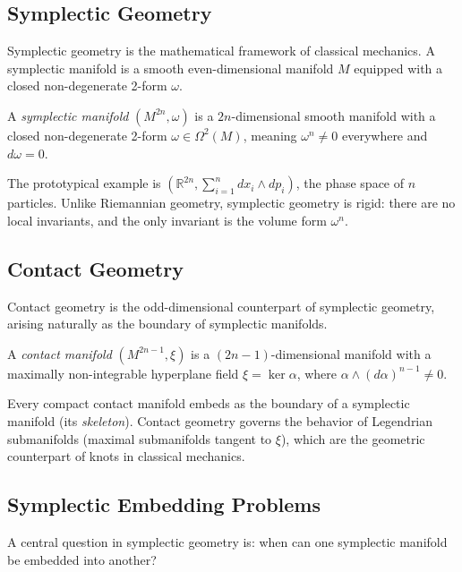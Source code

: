 \subsection{Symplectic Geometry}

Symplectic geometry is the mathematical framework of classical mechanics. A symplectic manifold is a smooth even-dimensional manifold $M$ equipped with a closed non-degenerate 2-form $\omega$.

\begin{definition}
A \emph{symplectic manifold} $(M^{2n}, \omega)$ is a $2n$-dimensional smooth manifold with a closed non-degenerate 2-form $\omega \in \Omega^2(M)$, meaning $\omega^n \neq 0$ everywhere and $d\omega = 0$.
\end{definition}

The prototypical example is $(\mathbb{R}^{2n}, \sum_{i=1}^{n} dx_i \wedge dp_i)$, the phase space of $n$ particles. Unlike Riemannian geometry, symplectic geometry is rigid: there are no local invariants, and the only invariant is the volume form $\omega^n$.

\subsection{Contact Geometry}

Contact geometry is the odd-dimensional counterpart of symplectic geometry, arising naturally as the boundary of symplectic manifolds.

\begin{definition}
A \emph{contact manifold} $(M^{2n-1}, \xi)$ is a $(2n-1)$-dimensional manifold with a maximally non-integrable hyperplane field $\xi = \ker \alpha$, where $\alpha \wedge (d\alpha)^{n-1} \neq 0$.
\end{definition}

Every compact contact manifold embeds as the boundary of a symplectic manifold (its \emph{skeleton}). Contact geometry governs the behavior of Legendrian submanifolds (maximal submanifolds tangent to $\xi$), which are the geometric counterpart of knots in classical mechanics.

\subsection{Symplectic Embedding Problems}

A central question in symplectic geometry is: when can one symplectic manifold be embedded into another?

